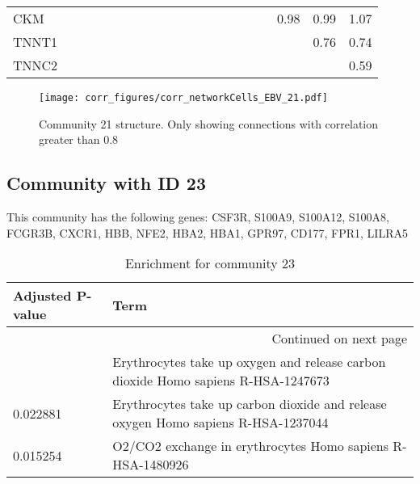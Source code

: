 \begin{longtable}{lrrrrrrrrrrrrrrrrrrr}
CKM     &             &           &             &               &            &             &            &           &            &            &            &              &             &            &            &           &        0.98 &        0.99 &     1.07 \\
TNNT1   &             &           &             &               &            &             &            &           &            &            &            &              &             &            &            &           &             &        0.76 &     0.74 \\
TNNC2   &             &           &             &               &            &             &            &           &            &            &            &              &             &            &            &           &             &             &     0.59 \\
\end{longtable}


\begin{figure}[h!]
\centering
\texttt{[image: corr\_figures/corr\_networkCells\_EBV\_21.pdf]}
\caption{Community 21 structure. Only showing connections with correlation greater than 0.8}
\end{figure}




\subsection*{Community with ID 23}
This community has the following genes: CSF3R, S100A9, S100A12, S100A8, FCGR3B, CXCR1, HBB, NFE2, HBA2, HBA1, GPR97, CD177, FPR1, LILRA5
\\
\begin{longtable}{p{2.4cm}p{14.5cm}}
\caption{Enrichment for community 23}\\
\toprule
Adjusted \newline P-value &                                                                               Term \\
\midrule
\endhead
\midrule
\multicolumn{2}{r}{{Continued on next page}} \\
\midrule
\endfoot

\bottomrule
\endlastfoot
                 0.019445 &  Erythrocytes take up oxygen and release carbon dioxide Homo sapiens R-HSA-1247673 \\
                 0.022881 &  Erythrocytes take up carbon dioxide and release oxygen Homo sapiens R-HSA-1237044 \\
                 0.015254 &                         O2/CO2 exchange in erythrocytes Homo sapiens R-HSA-1480926 \\
\end{longtable}


